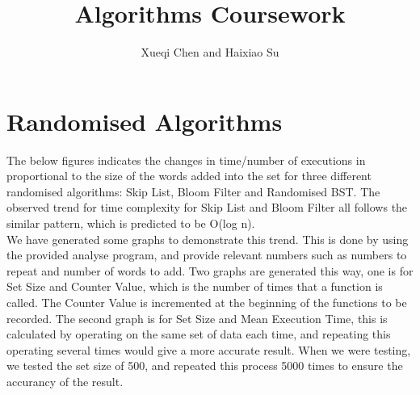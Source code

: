 \documentclass[11pt]{article}
\begin{document}
\title{Algorithms Coursework}
\author{Xueqi Chen and Haixiao Su}

\maketitle
\section*{Randomised Algorithms}
The below figures indicates the changes in time/number of executions in proportional to the size of the words added into the set for three different randomised algorithms: Skip List, Bloom Filter and Randomised BST. The observed trend for time complexity for Skip List and Bloom Filter all follows the similar pattern, which is predicted to be O(log n). \\
We have generated some graphs to demonstrate this trend. This is done by using the provided analyse program, and provide relevant numbers such as numbers to repeat and number of words to add. Two graphs are generated this way, one is for Set Size and Counter Value, which is the number of times that a function is called. The Counter Value is incremented at the beginning of the functions to be recorded. The second graph is for Set Size and Mean Execution Time, this is calculated by operating on the same set of data each time, and repeating this operating several times would give a more accurate result. When we were testing, we tested the set size of 500, and repeated this process 5000 times to ensure the accurancy of the result.
\end{document}
